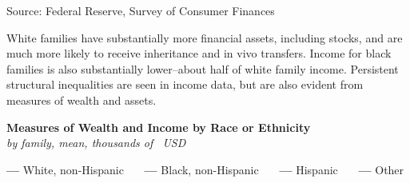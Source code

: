 \documentclass{report}
\begin{document}
{\begin{minipage}{0.76\textwidth}
\footnotesize{Source: Federal Reserve, Survey of Consumer Finances}
\vspace{1.5mm}

\small White families have substantially more financial assets, including stocks, and are much more likely to receive inheritance and in vivo transfers. Income for black families is also substantially lower--about half of white family income. Persistent structural inequalities are seen in income data, but are also evident from measures of wealth and assets.
\vspace{0.5mm}

\normalsize \textbf{Measures of Wealth and Income by Race or Ethnicity}\\
\footnotesize{\textit{by family, mean, thousands of \unskip \ USD}}
\vspace{-0.5mm}

\Large{\color{red!80!white}\textbf{---}} \footnotesize{White, non-Hispanic} \ \ \ \Large{\color{blue!80!black}\textbf{---}} \footnotesize{Black, non-Hispanic} \ \ \ \Large{\color{magenta!60!violet}\textbf{---}} \footnotesize{Hispanic} \ \ \ \Large{\color{black!40!white}\textbf{---}} \footnotesize{Other}
\end{minipage}
\vspace{-0.5mm}

}
\end{document}
